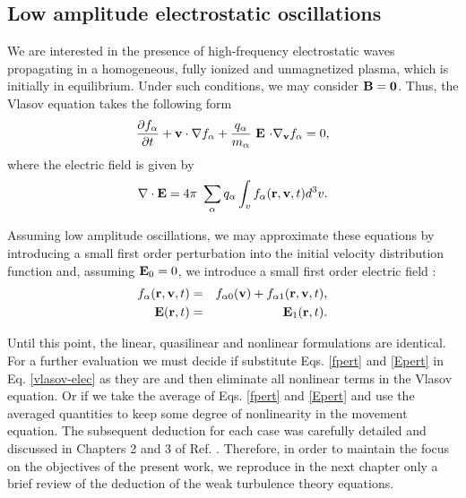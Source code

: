 \documentclass[12pt,a4paper,ruledheader]{report}
\begin{document}
\subsection{Low amplitude electrostatic oscillations}
We are interested in the presence of high-frequency electrostatic
waves propagating in a homogeneous, fully ionized and unmagnetized
plasma, which is initially in equilibrium. Under such conditions,
we may consider ${\bf B=0}$. Thus, the Vlasov equation takes the
following form
\begin{equation}
  \label{vlasov-elec}
  \frac{\partial f_\alpha}{\partial t}+{\bf v \cdot \nabla}f_\alpha
+\frac{q_{\alpha}}{m_\alpha}\ {\bf E}\ {\bf\cdot \nabla_v}f_\alpha=0,
\end{equation}
where the electric field is given by
\begin{equation}
{\bf \nabla \cdot E}  = 4\pi\ \sum_\alpha q_\alpha 
\int_v  f_\alpha({\bf r},{\bf v},t) d^3v.
\label{leidegauss}
\end{equation}

Assuming low amplitude oscillations, we may approximate these equations
by introducing a small first order perturbation into the initial velocity
distribution function and, assuming ${\bf E}_0=0$, we introduce a small
first order electric field :
\begin{eqnarray}
  \label{fpert}
  f_{\alpha}({\bf r}, {\bf v},t)&=&f_{\alpha0}({\bf v})
	    +f_{\alpha1}({\bf r}, {\bf v},t),\\
  {\bf E}({\bf r},t)&=&{\bf E}_1({\bf r},t).
\label{Epert}
\end{eqnarray}

Until this point, the linear, quasilinear and nonlinear formulations
are identical. For a further evaluation we must decide if substitute
Eqs. \eqref{fpert} and \eqref{Epert} in Eq. \eqref{vlasov-elec} as they
are and then eliminate all nonlinear terms in the Vlasov equation. Or if
we take the average of Eqs. \eqref{fpert} and \eqref{Epert} and use the
averaged quantities to keep some degree of nonlinearity in the movement
equation. The subsequent deduction for each case was carefully detailed
and discussed in Chapters 2 and 3 of Ref. \cite{Tigik2015}. Therefore,
in order to maintain the focus on the objectives of the present work, we
reproduce in the next chapter only a brief review of the deduction of
the weak turbulence theory equations. 
\end{document}
